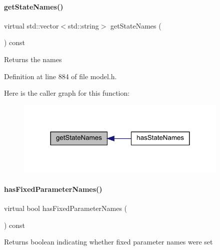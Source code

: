 \paragraph{\texorpdfstring{get\+State\+Names()}{getStateNames()}}
{\footnotesize\ttfamily virtual std\+::vector$<$std\+::string$>$ get\+State\+Names (\begin{DoxyParamCaption}{ }\end{DoxyParamCaption}) const\hspace{0.3cm}{\ttfamily [virtual]}}

\begin{DoxyReturn}{Returns}
the names 
\end{DoxyReturn}


Definition at line 884 of file model.\+h.

Here is the caller graph for this function\+:
\nopagebreak
\begin{figure}[H]
\begin{center}
\leavevmode
\includegraphics[width=288pt]{classamici_1_1_model_a1c55f5cf94db51bb2bbb26d4c425eb0a_icgraph}
\end{center}
\end{figure}
\mbox{\label{classamici_1_1_model_a964e924a1fe271f88bac4cfa909e2879}} 
\paragraph{\texorpdfstring{has\+Fixed\+Parameter\+Names()}{hasFixedParameterNames()}}
{\footnotesize\ttfamily virtual bool has\+Fixed\+Parameter\+Names (\begin{DoxyParamCaption}{ }\end{DoxyParamCaption}) const\hspace{0.3cm}{\ttfamily [virtual]}}

\begin{DoxyReturn}{Returns}
boolean indicating whether fixed parameter names were set 
\end{DoxyReturn}


